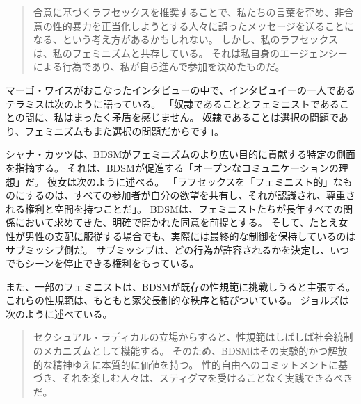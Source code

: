 \documentclass[paper=a4,book,openany]{jlreq}
\newcommand{\ig}[1]{}           %
\begin{document}
\begin{quote}
合意に基づくラフセックスを推奨することで、私たちの言葉を歪め、非合意の性的暴力を正当化しようとする人々に誤ったメッセージを送ることになる、という考え方があるかもしれない。
しかし、私のラフセックスは、私のフェミニズムと共存している。
それは私自身のエージェンシーによる行為であり、私が自ら進んで参加を決めたものだ。
\citep{tallon-hicks16:_can_you_be_femin_like_rough_sex}

\end{quote}

マーゴ・ワイス\ig{Margo Weiss}がおこなったインタビューの中で、インタビュイーの一人であるテラミスは次のように語っている。
「奴隷であることとフェミニストであることの間に、私はまったく矛盾を感じません。
奴隷であることは選択の問題であり、フェミニズムもまた選択の問題だからです」\citep{weiss11:_techn_pleas}。

シャナ・カッツは、BDSMがフェミニズムのより広い目的に貢献する特定の側面を指摘する。
それは、BDSMが促進する「オープンなコミュニケーションの理想」だ。
彼女は次のように述べる。
「ラフセックスを「フェミニスト的」なものにするのは、すべての参加者が自分の欲望を共有し、それが認識され、尊重される権利と空間を持つことだ」\citep{tallon-hicks16:_can_you_be_femin_like_rough_sex}。
BDSMは、フェミニストたちが長年すべての関係において求めてきた、明確で開かれた同意を前提とする。
そして、たとえ女性が男性の支配に服従する場合でも、実際には最終的な制御を保持しているのはサブミッシブ側だ。
サブミッシブは、どの行為が許容されるかを決定し、いつでもシーンを停止できる権利をもっている。

また、一部のフェミニストは、BDSMが既存の性規範に挑戦しうると主張する。
これらの性規範は、もともと家父長制的な秩序と結びついている。
ジョルズは次のように述べている。

\begin{quote}
  セクシュアル・ラディカルの立場からすると、性規範はしばしば社会統制のメカニズムとして機能する。
そのため、BDSMはその実験的かつ解放的な精神ゆえに本質的に価値を持つ。
性的自由へのコミットメントに基づき、それを楽しむ人々は、スティグマを受けることなく実践できるべきだ。
\citep[p.268]{jolles15:_pleas_pain_femin_polit_rough_sex}

\end{quote}
\end{document}
